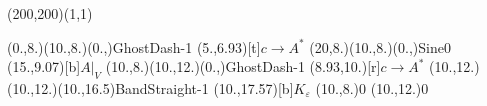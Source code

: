 \unitlength=1bp%

\begin{feynartspicture}(200,200)(1,1)

\FADiagram{}
\FAProp(0.,8.)(10.,8.)(0.,){GhostDash}{-1}
\FALabel(5.,6.93)[t]{$c\to A^*$}
\FAProp(20,8.)(10.,8.)(0.,){Sine}{0}
\FALabel(15.,9.07)[b]{$A|_V$}
\FAProp(10.,8.)(10.,12.)(0.,){GhostDash}{-1}
\FALabel(8.93,10.)[r]{$c\to A^*$}
\FAProp(10.,12.)(10.,12.)(10.,16.5){BandStraight}{-1}
\FALabel(10.,17.57)[b]{$K_\varepsilon$}
\FAVert(10.,8.){0}
\FAVert(10.,12.){0}
\end{feynartspicture}

